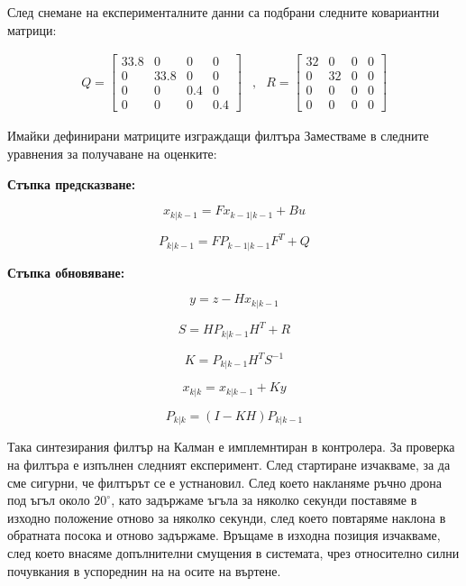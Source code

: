 След снемане на експерименталните данни са подбрани следните
ковариантни матрици:

\begin{align}
    Q =
    \begin{bmatrix}
        33.8 & 0 & 0 & 0 \\
        0 & 33.8 & 0 & 0 \\
        0 & 0 & 0.4 & 0 \\
        0 & 0 & 0 & 0.4
    \end{bmatrix} &,&
    R = \begin{bmatrix}
        32 & 0 & 0 & 0 \\
        0 & 32 & 0 & 0 \\
        0 & 0 & 0 & 0 \\
        0 & 0 & 0 & 0
    \end{bmatrix}
\end{align}

Имайки дефинирани матриците изграждащи филтъра Заместваме в следните уравнения за получаване на оценките:

\textbf{Стъпка предсказване:}

\begin{equation}
    x_{k|k-1} = F x_{k-1|k-1} + B u
\end{equation}

\begin{equation}
    P_{k|k-1} = F P_{k-1|k-1} F^T + Q
\end{equation}

\textbf{Стъпка обновяване:}

\begin{equation}
    y = z - H x_{k|k-1}
\end{equation}

\begin{equation}
    S = H P_{k|k-1} H^T + R
\end{equation}

\begin{equation}
    K = P_{k|k-1}H^T S^{-1}
\end{equation}

\begin{equation}
    x_{k|k} = x_{k|k-1} + K y
\end{equation}

\begin{equation}
    P_{k|k} = (I-KH)P_{k|k-1}
\end{equation}


Така синтезирания филтър на Калман е имплемнтиран в контролера.
За проверка на филтъра е изпълнен следният експеримент.
След стартиране изчакваме, за да сме сигурни, че филтърът се е устнановил.
След което накланяме ръчно дрона под ъгъл около \(20^{\circ}\), 
като задържаме ъгъла за няколко секунди поставяме в 
изходно положение отново за няколко секунди,
след което повтаряме наклона в обратната посока и отново задържаме.
Връщаме в изходна позиция изчакваме, след което внасяме допълнителни смущения в системата,
чрез относително силни почувкания в успореднин на на осите на въртене.

